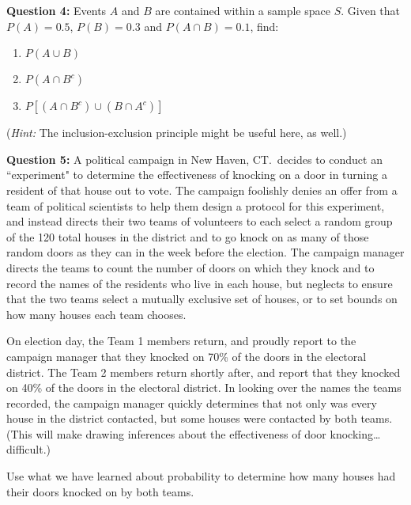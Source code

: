 \documentclass[12pt]{article}
\begin{document}
\bigskip


\noindent \textbf{Question 4:} Events $A$ and $B$ are contained within a sample space $S$. Given that $P(A)=0.5$, $P(B)=0.3$ and $P(A \cap B) = 0.1$, find:
\begin{enumerate}
\item $P(A \cup B)$
\item $P(A \cap B^c)$
\item $P[(A \cap B^c) \cup (B \cap A^c)]$
\end{enumerate}
\medskip
(\textit{Hint:} The inclusion-exclusion principle might be useful here, as well.)

\bigskip





\noindent \textbf{Question 5:} A political campaign in New Haven, CT.\ decides to conduct an ``experiment" to determine the effectiveness of knocking on a door in turning a resident of that house out to vote. The campaign foolishly denies an offer from a team of political scientists to help them design a protocol for this experiment, and instead directs their two teams of volunteers to each select a random group of the 120 total houses in the district and to go knock on as many of those random doors as they can in the week before the election. The campaign manager directs the teams to count the number of doors on which they knock and to record the names of the residents who live in each house, but neglects to ensure that the two teams select a mutually exclusive set of houses, or to set bounds on how many houses each team chooses. 

On election day, the Team 1 members return, and proudly report to the campaign manager that they knocked on 70\% of the doors in the electoral district. The Team 2 members return shortly after, and report that they knocked on 40\% of the doors in the electoral district. In looking over the names the teams recorded, the campaign manager quickly determines that not only was every house in the district contacted, but some houses were contacted by both teams. (This will make drawing inferences about the effectiveness of door knocking\ldots difficult.)

Use what we have learned about probability to determine how many houses had their doors knocked on by both teams.
\end{document}
